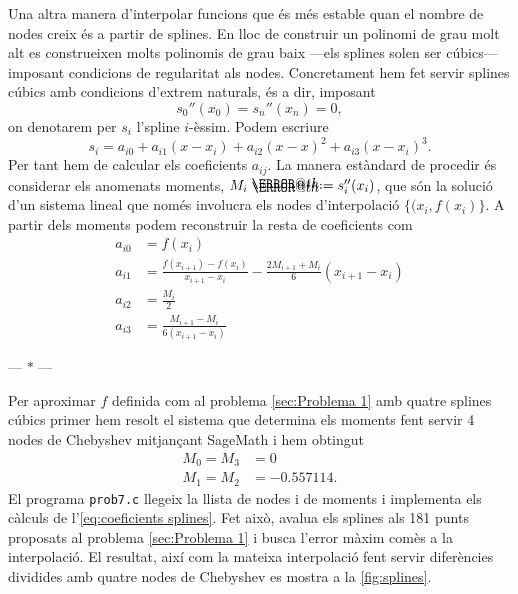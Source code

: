 \documentclass[12pt]{article}
\makeatletter
\numberwithin{table}{section}
\numberwithin{figure}{section}
\numberwithin{equation}{section}
\newcommand{\parbreak}{
	\begin{center}
		--- $\ast$ ---
	\end{center} 
}
\newcommand*{\defeq}{\mathrel{\rlap{%
    \raisebox{0.3ex}{$\m@th\cdot$}}%
  \raisebox{-0.3ex}{$\m@th\cdot$}}%
=}
\makeatother
\begin{document}
Una altra manera d'interpolar funcions que és més estable quan el nombre de nodes creix és a partir de splines. En lloc de construir un polinomi de grau molt alt es construeixen molts polinomis de grau baix ---els splines solen ser cúbics--- imposant condicions de regularitat als nodes. Concretament hem fet servir splines cúbics amb condicions d'extrem naturals, és a dir, imposant
\begin{equation*}
	s_0''(x_0) = s_n''(x_n) = 0,
\end{equation*}
on denotarem per \( s_i \) l'spline \( i \)-èssim. Podem escriure
\begin{equation*}
	s_i = a_{i0} + a_{i1}(x-x_i) + a_{i2}(x-x)^2 + a_{i3}(x-x_i)^3.
\end{equation*}
Per tant hem de calcular els coeficients \( a_{ij} \). La manera estàndard de procedir és considerar els anomenats moments, \( M_i \defeq s_i''(x_i) \), que són la solució d'un sistema lineal que només involucra els nodes d'interpolació \( \{(x_i,f(x_i)\} \). A partir dels moments podem reconstruir la resta de coeficients com
\begin{equation} \label{eq:coeficients splines}
\begin{aligned}
	a_{i0} & = f(x_i) \\
	a_{i1} & = \frac{f(x_{i+1}) - f(x_i)}{x_{i+1} - x_i} - \frac{2M_{i+1} + M_i}{6}(x_{i+1} - x_i) \\
	a_{i2} & = \frac{M_i}{2} \\
	a_{i3} & = \frac{M_{i+1} - M_i}{6(x_{i+1} - x_i)}
\end{aligned} 
\end{equation}

\parbreak

Per aproximar \( f \) definida com al problema \ref{sec:Problema 1} amb quatre splines cúbics primer hem resolt el sistema que determina els moments fent servir 4 nodes de Chebyshev mitjançant \textsf{SageMath} i hem obtingut 
\begin{equation*}
\begin{aligned}
	M_0 = M_3 &= 0 \\
	M_1 = M_2 &= \num{-0.557114}.
\end{aligned}
\end{equation*}
El programa \texttt{prob7.c} llegeix la llista de nodes i de moments i implementa els càlculs de l'\cref{eq:coeficients splines}. Fet això, avalua els splines als 181 punts proposats al problema \ref{sec:Problema 1} i busca l'error màxim comès a la interpolació. El resultat, així com la mateixa interpolació fent servir diferències dividides amb quatre nodes de Chebyshev es mostra a la \cref{fig:splines}. 
\end{document}

